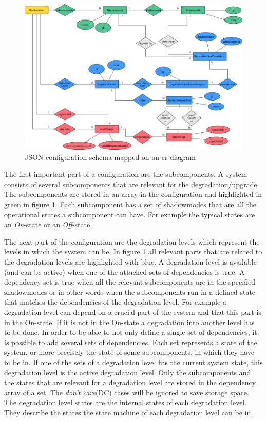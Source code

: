 \begin{figure}[ht]
    \centering
    \includegraphics[width=\textwidth]{img/configuration_diagramm.png}
    \caption{JSON configuration schema mapped on an er-diagram}
    \label{fig:configuration_diagram}
\end{figure}

\noindent The first important part of a configuration are the subcomponents. A system consists of several subcomponents that are relevant for the degradation/upgrade. The subcomponents are stored in an array in the configuration and highlighted in green in figure \ref{fig:configuration_diagram}. Each subcomponent has a set of shadowmodes that are all the operational states a subcomponent can have. For example the typical states are an \textit{On}-state or an \textit{Off}-state.

The next part of the configuration are the degradation levels which represent the levels in which the system can be. In figure \ref{fig:configuration_diagram} all relevant parts that are related to the degradation levels are highlighted with blue. A degradation level is available (and can be active) when one of the attached sets of dependencies is true. A dependency set is true when all the relevant subcomponents are in the specified shadowmodes or in other words when the subcomponents run in a defined state that matches the dependencies of the degradation level. For example a degradation level can depend on a crucial part of the system and that this part is in the On-state. If it is not in the On-state a degradation into another level has to be done. In order to be able to not only define a single set of dependencies, it is possible to add several sets of dependencies. Each set represents a state of the system, or more precisely the state of some subcomponents, in which they have to be in. If one of the sets of a degradation level fits the current system state, this degradation level is the active degradation level. Only the subcomponents and the states that are relevant for a degradation level are stored in the dependency array of a set. The \textit{don't care}(DC) cases will be ignored to save storage space. The degradation level states are the internal states of each degradation level. They describe the states the state machine of each degradation level can be in.


